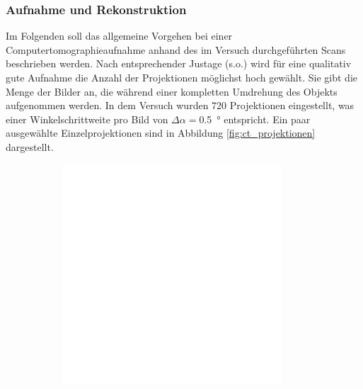 \documentclass[11pt, a4paper]{article}
\numberwithin{equation}{section}
\begin{document}
\subsubsection{Aufnahme und Rekonstruktion}

Im Folgenden soll das allgemeine Vorgehen bei einer Computertomographieaufnahme anhand des im Versuch durchgeführten Scans beschrieben werden.
Nach entsprechender Justage (s.o.) wird für eine qualitativ gute Aufnahme die Anzahl der Projektionen möglichst hoch gewählt.
Sie gibt die Menge der Bilder an, die während einer kompletten Umdrehung des Objekts aufgenommen werden.
In dem Versuch wurden \num{720} Projektionen eingestellt, was einer Winkelschrittweite pro Bild von $\Delta\alpha=$\SI{0.5}{\degree} entspricht.
Ein paar ausgewählte Einzelprojektionen sind in Abbildung \ref{fig:ct_projektionen} dargestellt.
\begin{figure}[ht]
	\begin{subfigure}[c]{0.5\textwidth}
		\centering
		\includegraphics[width=0.9\textwidth]{./figures/ct/Projection2_5.png}
	\end{subfigure}
	\begin{subfigure}[c]{0.5\textwidth}
		\centering

\end{subfigure}
\end{figure}
\end{document}
